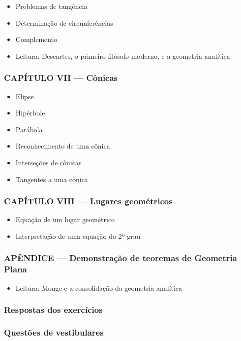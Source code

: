 \documentclass[a4paper,12pt]{article}[abntex2]
\begin{document}
\begin{itemize}
\item Problemas de tangência
\item Determinação de circunferências
\item Complemento
\item Leitura: Descartes, o primeiro filósofo moderno, e a geometria analítica
\end{itemize}
\subsubsection*{CAPÍTULO VII — Cônicas}

\begin{itemize}
\item Elipse
\item Hipérbole
\item Parábola
\item Reconhecimento de uma cônica
\item Interseções de cônicas
\item Tangentes a uma cônica
\end{itemize}
\subsubsection*{CAPÍTULO VIII — Lugares geométricos}

\begin{itemize}
\item Equação de um lugar geométrico
\item Interpretação de uma equação do 2º grau
\end{itemize}
\subsubsection*{APÊNDICE — Demonstração de teoremas de Geometria Plana}

\begin{itemize}
\item Leitura: Monge e a consolidação da geometria analítica
\end{itemize}
\subsubsection*{Respostas dos exercícios}

\subsubsection*{Questões de vestibulares}
\end{document}
